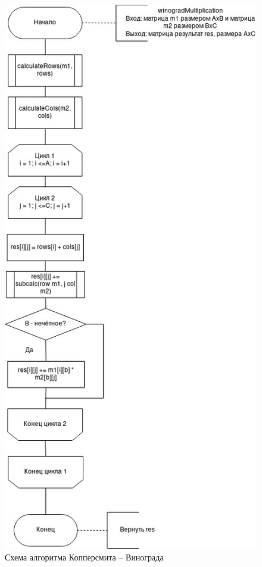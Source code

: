 \documentclass[12pt]{report}
\begin{document}
\begin{figure}[h]
	\centering
	\includegraphics[scale=0.6]{winograd_0.jpg}
	\caption{Схема алгоритма Копперсмита -- Винограда}
	\label{fig:mpr}
\end{figure}
\end{document}
